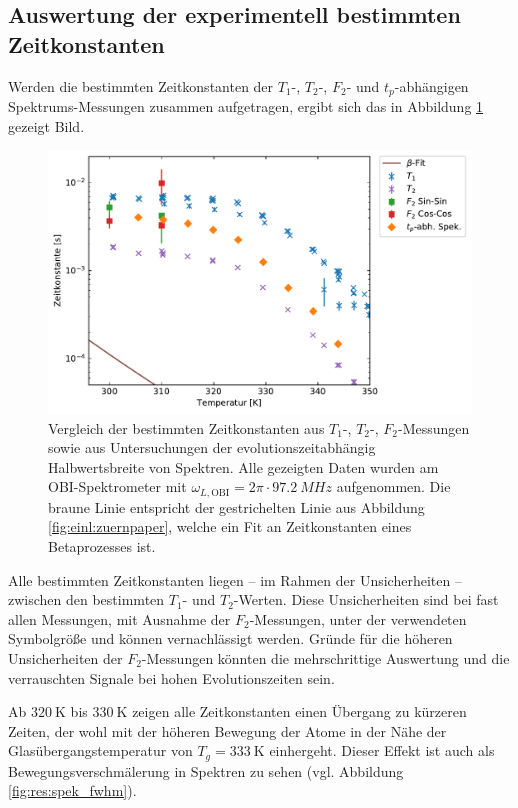 \subsection{Auswertung der experimentell bestimmten Zeitkonstanten} \label{section:res:dynausw}

Werden die bestimmten Zeitkonstanten der $T_1$-, $T_2$-, $F_2$- und $t_p$-abhängigen Spek\-trums-Mess\-un\-gen zusammen aufgetragen, ergibt sich das in Abbildung \ref{fig:res:dynvgl} gezeigt Bild.
\begin{figure}
	\begin{center}
		\includegraphics[width=.9\textwidth]{graphics/plot/dyn.pdf}
	\end{center}
	\caption{Vergleich der bestimmten Zeitkonstanten aus $T_1$-, $T_2$-, $F_2$-Messungen sowie aus Untersuchungen der evolutionszeitabhängig Halbwertsbreite von Spektren. Alle gezeigten Daten wurden am OBI-Spektrometer mit $\omega_{L, \text{OBI}} = 2\pi \cdot \SI{97.2}{MHz}$ aufgenommen. Die braune Linie entspricht der gestrichelten Linie aus Abbildung \ref{fig:einl:zuernpaper}, welche ein Fit an Zeitkonstanten eines Betaprozesses ist.} \label{fig:res:dynvgl}
\end{figure}
Alle bestimmten Zeitkonstanten liegen -- im Rahmen der Unsicherheiten -- zwischen den bestimmten $T_1$- und $T_2$-Werten. Diese Unsicherheiten sind bei fast allen Messungen, mit Ausnahme der $F_2$-Messungen, unter der verwendeten Symbolgröße und können vernachlässigt werden. Gründe für die höheren Unsicherheiten der $F_2$-Messungen könnten die mehrschrittige Auswertung und die verrauschten Signale bei hohen Evolutionszeiten sein.

Ab $\SI{320}{\kelvin}$ bis $\SI{330}{\kelvin}$ zeigen alle Zeitkonstanten einen Übergang zu kürzeren Zeiten, der wohl mit der höheren Bewegung der Atome in der Nähe der Glasübergangstemperatur von $T_g = \SI{333}{\kelvin}$ einhergeht. Dieser Effekt ist auch als Bewegungsverschmälerung in Spektren zu sehen (vgl. Abbildung \ref{fig:res:spek_fwhm}).

